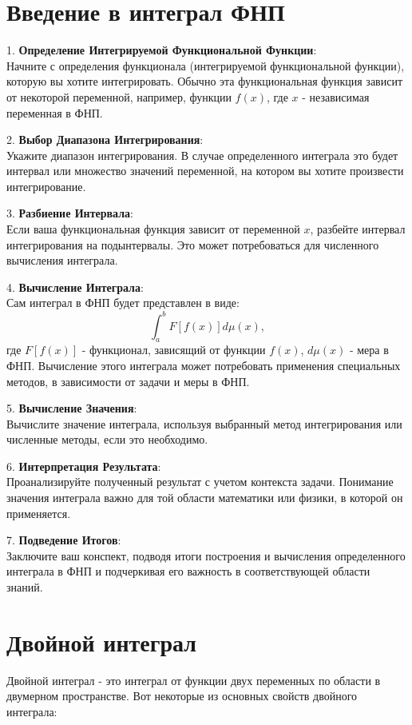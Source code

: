 \documentclass{article}
\begin{document}
 
\section{Введение в интеграл ФНП}
1. \textbf{Определение Интегрируемой Функциональной Функции}: \\
   Начните с определения функционала (интегрируемой функциональной функции), которую вы хотите интегрировать. Обычно эта функциональная функция зависит от некоторой переменной, например, функции $f(x)$, где $x$ - независимая переменная в ФНП.

2. \textbf{Выбор Диапазона Интегрирования}: \\
   Укажите диапазон интегрирования. В случае определенного интеграла это будет интервал или множество значений переменной, на котором вы хотите произвести интегрирование.

3. \textbf{Разбиение Интервала}: \\
   Если ваша функциональная функция зависит от переменной $x$, разбейте интервал интегрирования на подынтервалы. Это может потребоваться для численного вычисления интеграла.

4. \textbf{Вычисление Интеграла}: \\
   Сам интеграл в ФНП будет представлен в виде:
   \[
   \int_{a}^{b} F[f(x)] d\mu(x),
   \]
   где $F[f(x)]$ - функционал, зависящий от функции $f(x)$, $d\mu(x)$ - мера в ФНП. Вычисление этого интеграла может потребовать применения специальных методов, в зависимости от задачи и меры в ФНП.

5. \textbf{Вычисление Значения}: \\
   Вычислите значение интеграла, используя выбранный метод интегрирования или численные методы, если это необходимо.

6. \textbf{Интерпретация Результата}: \\
   Проанализируйте полученный результат с учетом контекста задачи. Понимание значения интеграла важно для той области математики или физики, в которой он применяется.

7. \textbf{Подведение Итогов}: \\
   Заключите ваш конспект, подводя итоги построения и вычисления определенного интеграла в ФНП и подчеркивая его важность в соответствующей области знаний.

\section{Двойной интеграл}
Двойной интеграл - это интеграл от функции двух переменных по области в двумерном пространстве. Вот некоторые из основных свойств двойного интеграла:
\end{document}
